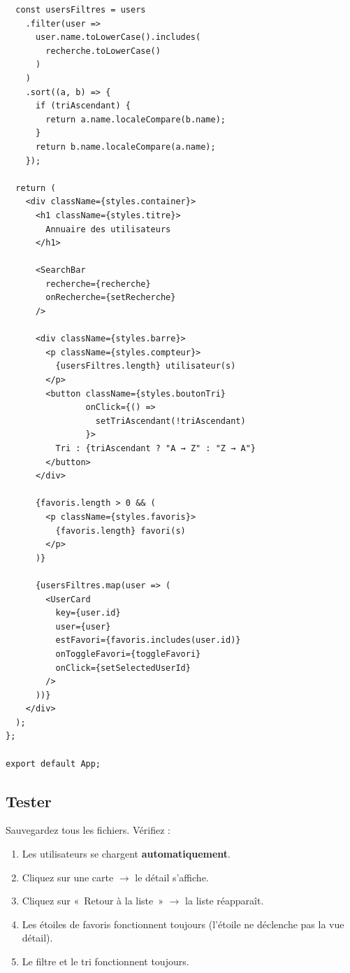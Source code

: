 \documentclass[11pt,a4paper]{article}
\begin{document}
\begin{lstlisting}
  const usersFiltres = users
    .filter(user =>
      user.name.toLowerCase().includes(
        recherche.toLowerCase()
      )
    )
    .sort((a, b) => {
      if (triAscendant) {
        return a.name.localeCompare(b.name);
      }
      return b.name.localeCompare(a.name);
    });

  return (
    <div className={styles.container}>
      <h1 className={styles.titre}>
        Annuaire des utilisateurs
      </h1>

      <SearchBar
        recherche={recherche}
        onRecherche={setRecherche}
      />

      <div className={styles.barre}>
        <p className={styles.compteur}>
          {usersFiltres.length} utilisateur(s)
        </p>
        <button className={styles.boutonTri}
                onClick={() =>
                  setTriAscendant(!triAscendant)
                }>
          Tri : {triAscendant ? "A → Z" : "Z → A"}
        </button>
      </div>

      {favoris.length > 0 && (
        <p className={styles.favoris}>
          {favoris.length} favori(s)
        </p>
      )}

      {usersFiltres.map(user => (
        <UserCard
          key={user.id}
          user={user}
          estFavori={favoris.includes(user.id)}
          onToggleFavori={toggleFavori}
          onClick={setSelectedUserId}
        />
      ))}
    </div>
  );
};

export default App;
\end{lstlisting}

\subsection{Tester}

Sauvegardez tous les fichiers. Vérifiez :
\begin{enumerate}[nosep]
\item Les utilisateurs se chargent \textbf{automatiquement}.
\item Cliquez sur une carte $\to$ le détail s'affiche.
\item Cliquez sur «~Retour à la liste~» $\to$ la liste réapparaît.
\item Les étoiles de favoris fonctionnent toujours (l'étoile ne déclenche pas la vue détail).
\item Le filtre et le tri fonctionnent toujours.
\end{enumerate}

\end{document}

